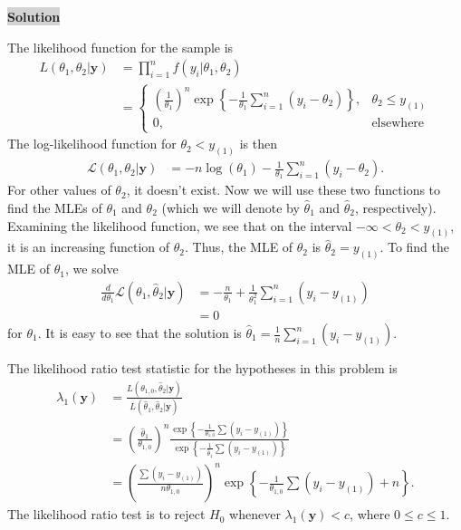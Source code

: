 \documentclass[12pt]{article}
\newcommand{\mybox}{%
    \collectbox{%
        \setlength{\fboxsep}{2pt}%
        \fbox{\BOXCONTENT}%
    }%
}
\begin{document}
\noindent\mybox{\colorbox{lightgray}{\textbf{Solution}}} \hspace{3mm}\hrulefill

\noindent The likelihood function for the sample is
\begin{align}
L(\theta_1, \theta_2|\textbf{y}) &= \prod_{i=1}^n f(y_i|\theta_1, \theta_2) \\
&= \begin{cases}
\left(\frac{1}{\theta_1}\right)^n \exp\left\lbrace -\frac{1}{\theta_1}\sum\limits_{i=1}^n(y_i-\theta_2)\right\rbrace, & \theta_2 \leq y_{(1)} \\
0, & \text{elsewhere}
\end{cases}
\end{align}
The log-likelihood function for $\theta_2 < y_{(1)}$ is then 
\begin{align}
\mathscr{L}(\theta_1,\theta_2|\textbf{y}) &= -n\log(\theta_1)-\frac{1}{\theta_1}\sum\limits_{i=1}^n(y_i - \theta_2).
\end{align}
For other values of $\theta_2$, it doesn't exist. Now we will use these two functions to find the MLEs of $\theta_1$ and $\theta_2$ (which we will denote by $\hat{\theta}_1$ and $\hat{\theta}_2$, respectively). Examining the likelihood function, we see that on the interval $-\infty < \theta_2 < y_{(1)}$, it is an increasing function of $\theta_2$. Thus, the MLE of $\theta_2$ is $\hat{\theta}_2 = y_{(1)}$. To find the MLE of $\theta_1$, we solve
\begin{align}
\frac{d}{d\theta_1}\mathscr{L}(\theta_1, \hat{\theta}_2|\textbf{y}) &= -\frac{n}{\theta_1}+\frac{1}{\theta_1^2}\sum\limits_{i=1}^n(y_i-y_{(1)}) \\
&= 0
\end{align}
for $\theta_1$.  It is easy to see that the solution is $\hat{\theta}_1 = \frac{1}{n}\sum\limits_{i=1}^n (y_i - y_{(1)}).$

The likelihood ratio test statistic for the hypotheses in this problem is 
\begin{align}
\lambda_1(\textbf{y}) &= \frac{L(\theta_{1,0}, \hat{\theta}_2|\textbf{y})}{L(\hat{\theta}_1, \hat{\theta}_2|\textbf{y})} \\
&= \left(\frac{\hat{\theta}_1}{\theta_{1,0}}\right)^n \frac{\exp\left\lbrace -\frac{1}{\theta_{1,0}}\sum(y_i-y_{(1)})\right\rbrace}{\exp\left\lbrace -\frac{1}{\hat{\theta}_1}\sum(y_i-y_{(1)})\right\rbrace} \\
&= \left(\frac{\sum(y_i-y_{(1)})}{n\theta_{1,0}}\right)^n\exp\left\lbrace -\frac{1}{\theta_{1,0}}\sum(y_i-y_{(1)}) + n\right\rbrace.
\end{align}
The likelihood ratio test is to reject $H_0$ whenever $\lambda_1(\textbf{y}) < c$, where $0\leq c \leq 1$. 
\end{document}
